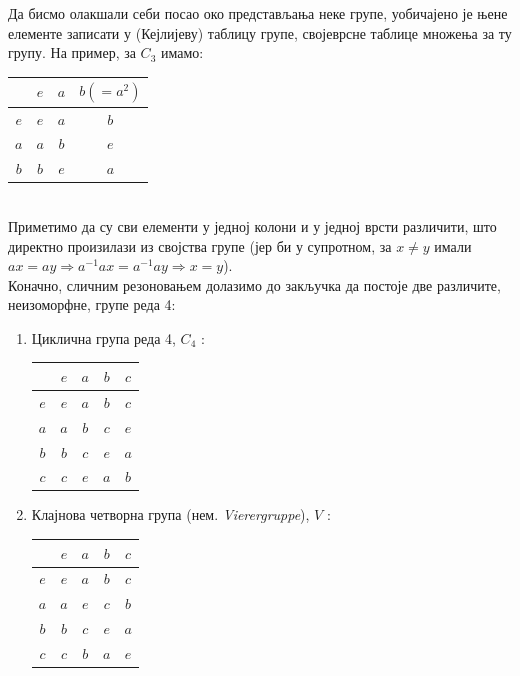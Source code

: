 \documentclass{report}
\theoremstyle{plain}
\theoremstyle{definition}
\begin{document}
Да бисмо олакшали себи посао око представљања неке групе, уобичајено је њене елементе записати у (Кејлијеву) таблицу групе, својеврсне таблице множења за ту групу. На пример, за $C_3$ имамо:\\

\begin{tabular}{c|c c c}
      & $e$ & $a$ & $b(=a^2)$ \\ \hline
  $e$ & $e$ & $a$ & $b$ \\
  $a$ & $a$ & $b$ & $e$ \\
  $b$ & $b$ & $e$ & $a$ \\
\end{tabular}\\

Приметимо да су сви елементи у једној колони и у једној врсти различити, што директно произилази из својства групе (јер би у супротном, за $x\neq y$ имали $ax = ay \Rightarrow a^{-1}ax = a^{-1}ay \Rightarrow x=y$).\\

Коначно, сличним резоновањем долазимо до закључка да постоје две различите, неизоморфне, групе реда 4:
\begin{enumerate}
  \item Циклична група реда 4, $C_4$ :
  \begin{tabular}{c|c c c c}
      & $e$ & $a$ & $b$ & $c$ \\ \hline
  $e$ & $e$ & $a$ & $b$ & $c$ \\
  $a$ & $a$ & $b$ & $c$ & $e$ \\
  $b$ & $b$ & $c$ & $e$ & $a$ \\
  $c$ & $c$ & $e$ & $a$ & $b$ \\
  \end{tabular}
  \item Клајнова четворна група (нем. \emph{Vierergruppe}), $V$ :
  \begin{tabular}{c|c c c c}
      & $e$ & $a$ & $b$ & $c$ \\ \hline
  $e$ & $e$ & $a$ & $b$ & $c$ \\
  $a$ & $a$ & $e$ & $c$ & $b$ \\
  $b$ & $b$ & $c$ & $e$ & $a$ \\
  $c$ & $c$ & $b$ & $a$ & $e$ \\
  \end{tabular}
\end{enumerate}
\end{document}
